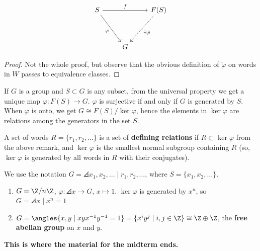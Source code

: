 \[\begin{tikzcd}
	S && {F(S)} \\
	\\
	& G
	\arrow["f", from=1-1, to=1-3]
	\arrow["\varphi"', from=1-1, to=3-2]
	\arrow["{\exists \tilde \varphi}", dashed, from=1-3, to=3-2]
\end{tikzcd}\]

\begin{proof}
    Not the whole proof, but observe that the obvious definition of $\tilde \varphi$ on words in $W$ passes to equivalence classes.
\end{proof}

\begin{rmk}
    If $G$ is a group and $S \subset G$ is any subset, from the universal property we get a unique map $\varphi:F(S) \to G$. $\varphi$ is surjective if and only if $G$ is generated by $S$. When $\varphi$ is onto, we get $G \cong F(S) / \ker \varphi$, hence the elements in $\ker \varphi$ are relations among the generators in the set $S$.
\end{rmk}

\begin{defn}[Relations]
    A set of words $R=\{r_1,r_2,\dots\}$ is a set of \textbf{defining relations} if $R \subset \ker \varphi$ from the above remark, and $\ker \varphi$ is the smallest normal subgroup containing $R$ (so, $\ker\varphi$ is generated by all words in $R$ with their conjugates).

    We use the notation $G= \angles{x_1,x_2, \dots  \mid r_1,r_2,\dots}$, where $S = \{x_1,x_2,\dots\}$.
\end{defn}

\begin{ex}
    \begin{enumerate}
        \item $G = \Z/n\Z$, $\varphi :\angles{x} \to G$, $x \mapsto 1$. $\ker \varphi$ is generated by $x^n$, so $G = \angles{x \mid x^n=1}$
        \item $G = \angles{x,y \mid xyx^{-1}y^{-1} = 1}= \{x^iy^j \mid i,j \in \Z\} \cong \Z \oplus \Z$, the \textbf{free abelian group} on $x$ and $y$.
    \end{enumerate}
\end{ex}

\textbf{This is where the material for the midterm ends.}


